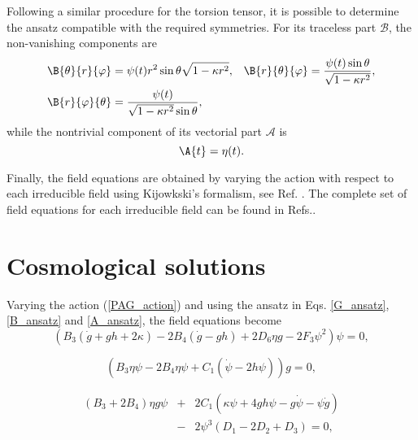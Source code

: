 Following a similar procedure for the torsion tensor, it is possible to determine the ansatz compatible with 
the required symmetries. For its traceless part $\mathcal{B}$, the non-vanishing components are
\begin{equation}
\label{B_ansatz}
\begin{aligned}
    \B{\theta}{r}{\varphi} & = \psi (t) r^2\sin\theta \sqrt{1 - \kappa r^2}, &
    \B{r}{\theta}{\varphi} & =\frac{\psi (t) \sin \theta}{\sqrt{1 - \kappa r^2}}, \\
    \B{r}{\varphi}{\theta} & =\frac{\psi(t)}{ \sqrt{1-\kappa r^{2}} \sin \theta},
\end{aligned}
\end{equation}
while the nontrivial component of its vectorial part $\mathcal{A}$ is
\begin{equation}
    \label{A_ansatz}
    \A{t} = \eta(t).
\end{equation}

Finally, the field equations are obtained by varying the action with respect to each irreducible field using Kijowkski's 
formalism, see Ref. \cite{KJ_Formalism,Castillo_Felisola_2020}. The complete  set of field equations for each irreducible field can be found in Refs.\cite{Castillo_Felisola_2020,Castillo-Felisola_2023}.

\section{Cosmological solutions}
\label{sec:solutions}
Varying the action (\ref{PAG_action}) and using the ansatz in Eqs. \eqref{G_ansatz}, \eqref{B_ansatz} and \eqref{A_ansatz}, the field equations become
\begin{equation}
    \label{Feq_1}
    \left(B_3\left(\dot{g} + gh + 2\kappa\right) - 2B_4\left(\dot{g} - gh\right) + 2D_6\eta g - 2F_3\psi^2\right)\psi = 0,
\end{equation}

\begin{equation}
    \label{Feq_2}
    (B_3\eta\psi -2B_4\eta\psi + C_1(\dot{\psi} - 2h\psi))g = 0,
\end{equation}

\begin{eqnarray}
    \label{Feq_3}
    \left(B_3 + 2B_4\right)\eta g\psi &+& 2C_1(\kappa\psi + 4gh\psi - g\dot{\psi} - \psi\dot{g}) \nonumber \\ &-& 2\psi^3(D_1 - 2D_2 + D_3) = 0,
\end{eqnarray}

